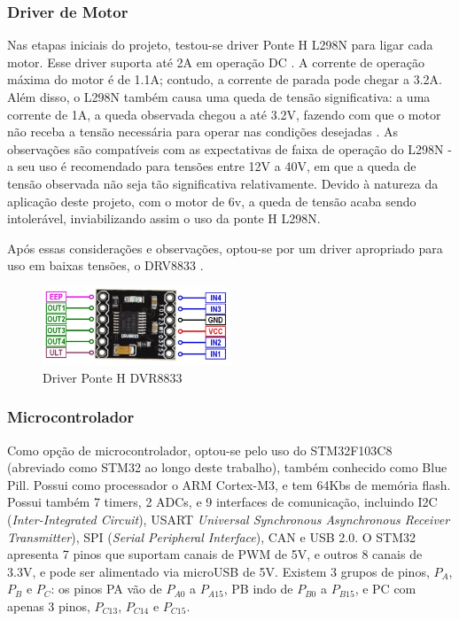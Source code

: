 \subsubsection{Driver de Motor}
Nas etapas iniciais do projeto, testou-se driver Ponte H L298N para ligar cada motor. Esse driver suporta até 2A em
operação DC \cite{datasheel_l298n}. A corrente de operação máxima do motor é de 1.1A; contudo, a corrente de parada
pode chegar a 3.2A. Além disso, o L298N também causa uma queda de tensão significativa: a uma corrente de 1A, a queda
observada chegou a até 3.2V, fazendo com que o motor não receba a tensão necessária para operar nas condições
desejadas \cite{datasheel_l298n}. As observações são compatíveis com as expectativas de faixa de operação do L298N - a
seu uso é recomendado para tensões entre 12V a 40V, em que a queda de tensão observada não seja tão significativa
relativamente. Devido à natureza da aplicação deste projeto, com o motor de 6v, a queda de tensão acaba sendo
intolerável, inviabilizando assim o uso da ponte H L298N.

Após essas considerações e observações, optou-se por um driver apropriado para uso em baixas tensões, o DRV8833
\cite{datasheel_dvr8833}.


\begin{figure}[htb]
	\centering
	\includegraphics[width=0.5\textwidth]{figures/DRV8833-Dual-Driver-Pinout}
	\caption{Driver Ponte H DVR8833 \cite{DRV8833_image}}
\end{figure}

\subsubsection{Microcontrolador}

Como opção de microcontrolador, optou-se pelo uso do STM32F103C8 (abreviado como STM32 ao longo deste trabalho),
também conhecido como Blue Pill. Possui como processador o ARM Cortex-M3, e tem 64Kbs de memória flash.  Possui também 7 timers, 2 ADCs, e 9 interfaces de comunicação, incluindo I2C (\textit{Inter-Integrated Circuit}), USART 
\textit{Universal Synchronous Asynchronous Receiver Transmitter}), SPI (\textit{Serial Peripheral Interface}), CAN e
USB 2.0. O STM32 apresenta 7 pinos que suportam canais de PWM de 5V, e outros 8 canais de 3.3V, e pode ser alimentado
via microUSB de 5V. Existem 3 grupos de pinos,  $P_{A}$,  $P_{B}$ e  $P_{C}$: os pinos PA vão de $P_{A0}$ 
a $P_{A15}$, PB indo de $P_{B0}$ a $P_{B15}$, e PC com apenas 3 pinos, $P_{C13}$, $P_{C14}$ e $P_{C15}$.

